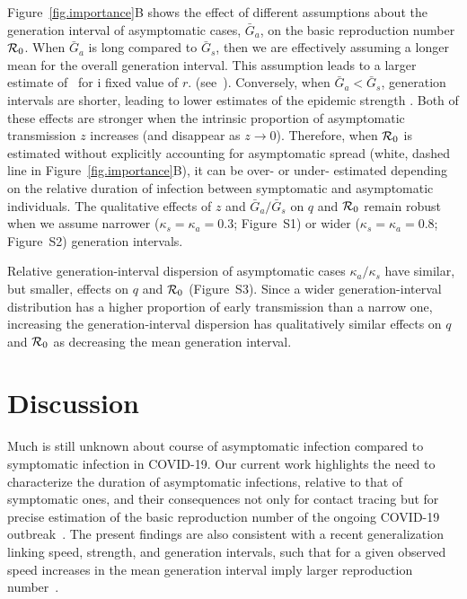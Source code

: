 Figure~\ref{fig.importance}B shows the effect of different assumptions about the generation interval of asymptomatic cases, $\bar G_a$, on the basic reproduction number ${\cal{R}}_0$.
When $\bar G_a$ is long compared to $\bar G_s$, then we are effectively assuming a longer mean for the overall generation interval. 
This assumption leads to a larger estimate of \Ro\ for i fixed value of $r$. (see~\citep{park_2019practical}).
Conversely, when $\bar G_a < \bar G_s$, generation intervals are shorter, leading to lower estimates of the epidemic strength \Ro. Both of these effects are stronger when the intrinsic proportion of asymptomatic transmission $z$ increases (and disappear as $z\to0$).
Therefore, when ${\cal{R}}_0$ is estimated without explicitly accounting for asymptomatic spread (white, dashed line in Figure~\ref{fig.importance}B), it can be over- or under- estimated depending on the relative duration of infection between symptomatic and asymptomatic individuals.
The qualitative effects of $z$ and $\bar G_a/\bar G_s$ on $q$ and ${\cal{R}}_0$ remain robust when we assume narrower ($\kappa_s = \kappa_a = 0.3$; Figure~S1) or wider ($\kappa_s = \kappa_a = 0.8$; Figure~S2) generation intervals.

Relative generation-interval dispersion of asymptomatic cases $\kappa_a/\kappa_s$ have similar, but smaller, effects on $q$ and ${\cal{R}}_0$ (Figure~S3).
Since a wider generation-interval distribution has a higher proportion of early transmission than a narrow one, increasing the generation-interval dispersion has qualitatively similar effects on $q$ and ${\cal{R}}_0$ as decreasing the mean generation interval.

\section{Discussion}

Much is still unknown about course of asymptomatic infection compared to symptomatic infection in COVID-19. 
Our current work highlights the need to characterize the duration of asymptomatic infections, relative to that of symptomatic ones, and their consequences not only for contact tracing but for precise estimation of the basic reproduction number of the ongoing COVID-19 outbreak~\citep{park_preprint}.
The present findings are also consistent with a recent generalization linking speed, strength, and generation intervals, such that for a given observed speed increases in the mean generation interval imply larger reproduction number~\citep{park_2019practical}.

